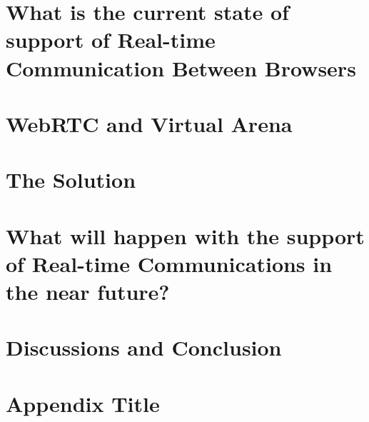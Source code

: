 \documentclass[11pt,a4paper]{report}
\begin{document}
\chapter{What is the current state of support of Real-time Communication Between Browsers}

\chapter{WebRTC and Virtual Arena}


\chapter{The Solution}



\chapter{What will happen with the support of Real-time Communications in the near future?}




\chapter{Discussions and Conclusion}



\appendix
\chapter{Appendix Title}

\printglossaries
\end{document}
